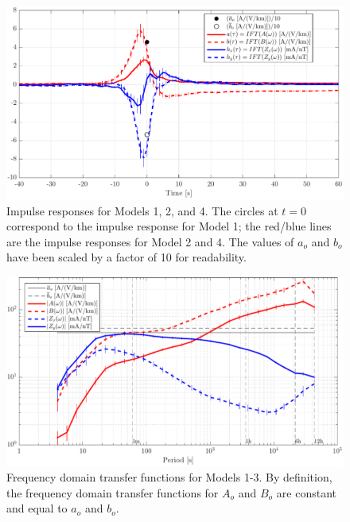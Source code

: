 \documentclass[draft,linenumbers]{agujournal2018}
\begin{document}
\begin{figure}[h]
\centering
\includegraphics[width=\textwidth]{figures/plot_TF_aves_H-options-1.pdf}
\caption{Impulse responses for Models 1, 2, and 4. The circles at $t = 0$ correspond to the impulse response for Model 1; the red/blue lines are the impulse responses for Model 2 and 4. The values of $a_o$ and $b_o$ have been scaled by a factor of 10 for readability.}
\label{H}
\end{figure}

\begin{figure}[h]
\centering
\includegraphics[width=\textwidth]{figures/plot_TF_aves_Z-options-1.pdf}
\caption{Frequency domain transfer functions for Models 1-3. By definition, the frequency domain transfer functions for $A_o$ and $B_o$ are constant and equal to $a_o$ and $b_o$.}
\label{Z}
\end{figure}
\end{document}
